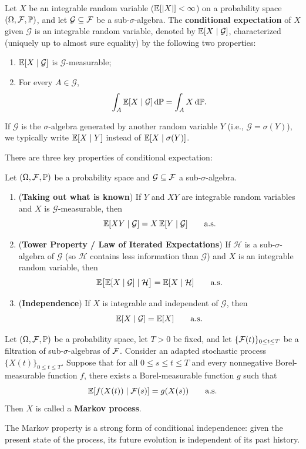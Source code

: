 \begin{definition}\label{def:cond-exp-app}
Let $X$ be an integrable random variable ($\mathbb{E}[|X|] < \infty$) on a probability space $(\Omega, \mathcal{F}, \mathbb{P})$, and let $\mathcal{G} \subseteq \mathcal{F}$ be a sub-$\sigma$-algebra. The \textbf{conditional expectation} of $X$ given $\mathcal{G}$ is an integrable random variable, denoted by $\mathbb{E}[X \mid \mathcal{G}]$, characterized (uniquely up to almost sure equality) by the following two properties:
\begin{enumerate}
    \item $\mathbb{E}[X \mid \mathcal{G}]$ is $\mathcal{G}$-measurable;
    \item For every $A \in \mathcal{G}$,
    \[
    \int_{A} \mathbb{E}[X \mid \mathcal{G}]\,\mathrm{d}\mathbb{P} = \int_{A} X\,\mathrm{d}\mathbb{P}.
    \]
\end{enumerate}
\end{definition}
\begin{note}
    If $\mathcal{G}$ is the $\sigma$-algebra generated by another random variable $Y$ (i.e., $\mathcal{G} = \sigma(Y)$), we typically write $\mathbb{E}[X \mid Y]$ instead of $\mathbb{E}[X \mid \sigma(Y)]$.
\end{note}

There are three key properties of conditional expectation:
\begin{proposition}\label{prop:cond-exp-props}
Let $(\Omega, \mathcal{F}, \mathbb{P})$ be a probability space and $\mathcal{G} \subseteq \mathcal{F}$ a sub-$\sigma$-algebra.
\begin{enumerate}
    \item (\textbf{Taking out what is known}) If $Y$ and $XY$ are integrable random variables and $X$ is $\mathcal{G}$-measurable, then
    \[
    \mathbb{E}[XY \mid \mathcal{G}] = X\,\mathbb{E}[Y \mid \mathcal{G}] \qquad \text{a.s.}
    \]
    \item (\textbf{Tower Property / Law of Iterated Expectations}) If $\mathcal{H}$ is a sub-$\sigma$-algebra of $\mathcal{G}$ (so $\mathcal{H}$ contains less information than $\mathcal{G}$) and $X$ is an integrable random variable, then
    \[
    \mathbb{E}\bigl[\mathbb{E}[X \mid \mathcal{G}] \mid \mathcal{H}\bigr] = \mathbb{E}[X \mid \mathcal{H}] \qquad \text{a.s.}
    \]
    \item (\textbf{Independence}) If $X$ is integrable and independent of $\mathcal{G}$, then
    \[
    \mathbb{E}[X \mid \mathcal{G}] = \mathbb{E}[X] \qquad \text{a.s.}
    \]
\end{enumerate}
\end{proposition}

\begin{definition}\label{def:markov-process}
Let $(\Omega, \mathcal{F}, \mathbb{P})$ be a probability space, let $T > 0$ be fixed, and let $\{\mathcal{F}(t)\}_{0 \leq t \leq T}$ be a filtration of sub-$\sigma$-algebras of $\mathcal{F}$. Consider an adapted stochastic process $\{X(t)\}_{0 \leq t \leq T}$. Suppose that for all $0 \leq s \leq t \leq T$ and every nonnegative Borel-measurable function $f$, there exists a Borel-measurable function $g$ such that
\[
\mathbb{E}[f(X(t)) \mid \mathcal{F}(s)] = g(X(s)) \qquad \text{a.s.}
\]
Then $X$ is called a \textbf{Markov process}.
\end{definition}
The Markov property is a strong form of conditional independence: given the present state of the process, its future evolution is independent of its past history.
